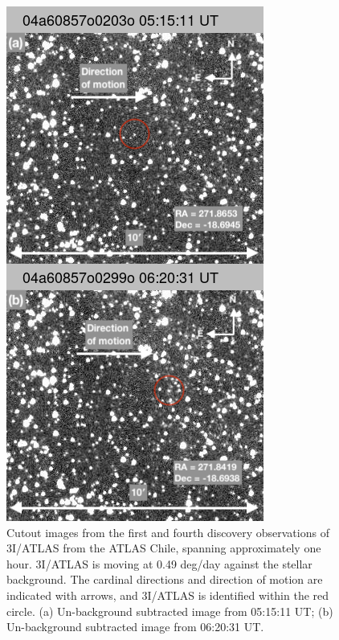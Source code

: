 \documentclass[linenumbers,twocolumn,longbib]{aastex7}
\begin{document}
\begin{figure}
    \centering
    \includegraphics[width=1.\linewidth]{static/3I_discovery_montage2.png}
    \caption{Cutout images from the first and fourth discovery observations of 3I/ATLAS from the ATLAS Chile, spanning approximately one hour. 3I/ATLAS is moving at 0.49 deg/day against the stellar background. The cardinal directions and direction of motion are indicated with arrows, and 3I/ATLAS is identified within the red circle. (a) Un-background subtracted image from 05:15:11 UT; (b) Un-background subtracted image from 06:20:31 UT. }
    \label{fig:discovery}
\end{figure}
\end{document}
